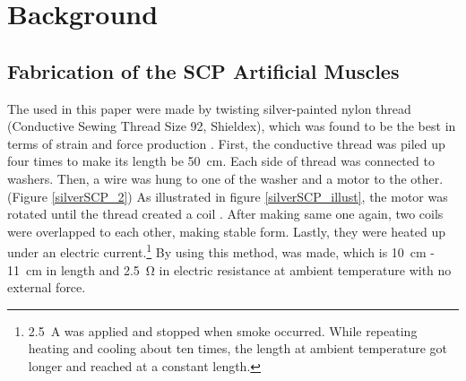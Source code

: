 \section{Background} \label{section_background}




\subsection{Fabrication of the SCP Artificial Muscles}
The \scps used in this paper were made by twisting silver-painted nylon thread (Conductive Sewing Thread Size 92, Shieldex), which was found to be the best in terms of strain and force production \cite{haines}. First, the conductive thread was piled up four times to make its length be \SI{50}{\centi\meter}. Each side of thread was connected to washers. Then, a wire was hung to one of the washer and a motor to the other. (Figure \ref{silverSCP_2})
As illustrated in figure \ref{silverSCP_illust}, the motor was rotated until the thread created a coil \cite{fab_coil}. After making same one again, two coils were overlapped to each other, making stable form. 
Lastly, they were heated up under an electric current.\footnote{\SI{2.5}{\ampere} was applied and stopped when smoke occurred. While repeating heating and cooling about ten times, the length at ambient temperature got longer and reached at a constant length.} By using this method, \scp was made, which is \SI{10}{\centi\meter} - \SI{11}{\centi\meter} in length and \SI{2.5}{\ohm} in electric resistance at ambient temperature with no external force.

